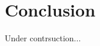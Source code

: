 \documentclass[conference]{../sty/IEEEtran}
\begin{document}




\section{Conclusion}
Under contrsuction...

















%



\end{document}
